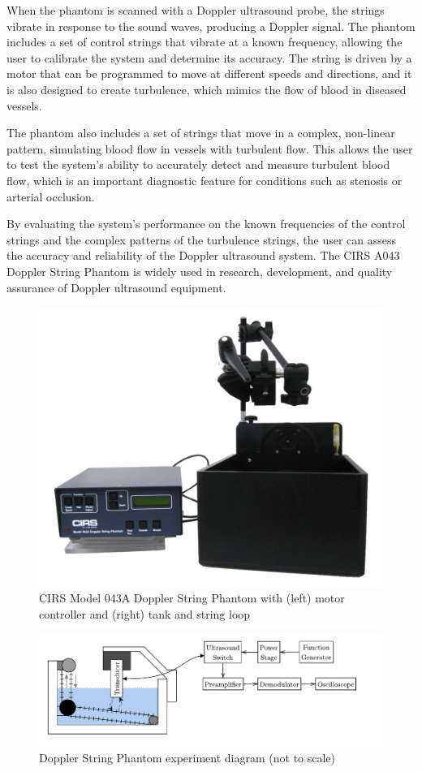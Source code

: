 When the phantom is scanned with a Doppler ultrasound probe, the strings vibrate in response to the sound waves, producing a Doppler signal. The phantom includes a set of control strings that vibrate at a known frequency, allowing the user to calibrate the system and determine its accuracy. The string is driven by a motor that can be programmed to move at different speeds and directions, and it is also designed to create turbulence, which mimics the flow of blood in diseased vessels.

The phantom also includes a set of strings that move in a complex, non-linear pattern, simulating blood flow in vessels with turbulent flow. This allows the user to test the system's ability to accurately detect and measure turbulent blood flow, which is an important diagnostic feature for conditions such as stenosis or arterial occlusion.

By evaluating the system's performance on the known frequencies of the control strings and the complex patterns of the turbulence strings, the user can assess the accuracy and reliability of the Doppler ultrasound system. The CIRS A043 Doppler String Phantom is widely used in research, development, and quality assurance of Doppler ultrasound equipment.
\begin{figure}[htbp]
	\centering
	\includegraphics[width=.8\textwidth]{Figures/5_cirs_043a_image.jpg}
	\caption[CIRS Model 043A Doppler String Phantom]{CIRS Model 043A Doppler String Phantom with (left) motor controller and (right) tank and string loop}
\end{figure}

\begin{figure}[htbp]
	\centering
	\includegraphics[width=.8\textwidth]{Figures/5_doppler_string_phantom_experiment.pdf}
	\caption{Doppler String Phantom experiment diagram (not to scale)}
	\label{fig:5_doppler_string_experiment}
\end{figure}
